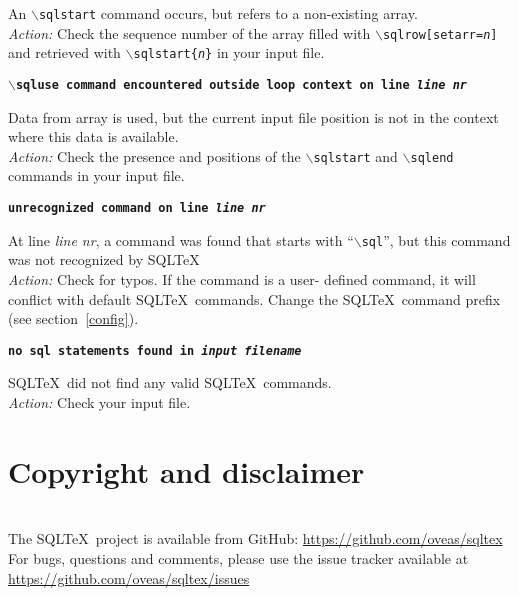 \documentclass{article}
\newcommand{\bs}{\ensuremath{\backslash}}
\newcommand{\vs}{\vspace{3mm}}
\begin{document}
\vspace{1mm}

\noindent An \texttt{\bs sqlstart} command occurs, but refers to a non-existing array. \\
\textit{Action:} Check the sequence number of the array filled with \texttt{\bs sqlrow[setarr=\textit{n}]} and retrieved with \texttt{\bs sqlstart\{\textit{n}\}} in your input file.

\vs

\noindent\textbf{\texttt{\bs sqluse command encountered outside loop context on line \textit{line nr}}}

\vspace{1mm}

\noindent Data from array is used, but the current input file position is not in the context where this data is available.\\
\textit{Action:} Check the presence and positions of the \texttt{\bs sqlstart} and \texttt{\bs sqlend} commands in your input file.

\vs

\noindent\textbf{\texttt{unrecognized command on line \textit{line nr}}}

\vspace{1mm}

\noindent At line \textit{line nr}, a command was found that starts with ``\texttt{\bs sql}'',
but this command was not recognized by SQL\TeX\. \\
\textit{Action:} Check for typos. If the command is a user- defined command, it will
conflict with default SQL\TeX\ commands. Change the SQL\TeX\ command prefix (see section~\ref{config}).

\vs

\noindent\textbf{\texttt{no sql statements found in \textit{input filename}}}

\vspace{1mm}

\noindent SQL\TeX\ did not find any valid SQL\TeX\ commands. \\
\textit{Action:} Check your input file.


\section{Copyright and disclaimer}

\noindent\hrulefill \\
The SQL\TeX\ project is available from GitHub: \url{https://github.com/oveas/sqltex}\\
For bugs, questions and comments, please use the issue tracker available at \url{https://github.com/oveas/sqltex/issues}
\end{document}
